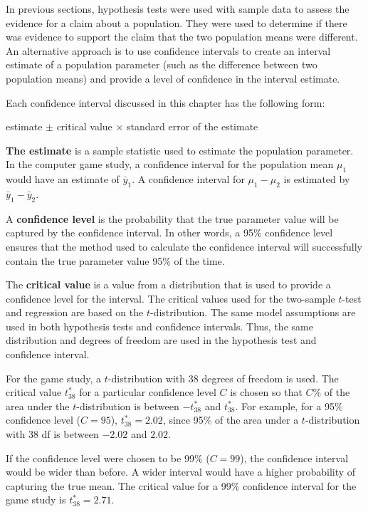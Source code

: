 \documentclass[
]{book}
\begin{document}
In previous sections, hypothesis tests were used with sample data to assess the evidence for a claim about a population. They were used to determine if there was evidence to support the claim that the two population means were different. An alternative approach is to use confidence intervals to create an interval estimate of a population parameter (such as the difference between two population means) and provide a level of confidence in the interval estimate.

Each confidence interval discussed in this chapter has the following form:

estimate \(\pm\) critical value \(\times\) standard error of the estimate

\textbf{The estimate} is a sample statistic used to estimate the population parameter. In the computer game study, a confidence interval for the population mean \(\mu_1\) would have an estimate of \(\bar{y}_1\). A confidence interval for \(\mu_1 - \mu_2\) is estimated by \(\bar{y}_1 - \bar{y}_2\).

A \textbf{confidence level} is the probability that the true parameter value will be captured by the confidence interval. In other words, a 95\% confidence level ensures that the method used to calculate the confidence interval will successfully contain the true parameter value 95\% of the time.

The \textbf{critical value} is a value from a distribution that is used to provide a confidence level for the interval. The critical values used for the two-sample \(t\)-test and regression are based on the \(t\)-distribution. The same model assumptions are used in both hypothesis tests and confidence intervals. Thus, the same distribution and degrees of freedom are used in the hypothesis test and confidence interval.

For the game study, a \(t\)-distribution with 38 degrees of freedom is used. The critical value \(t^*_{38}\) for a particular confidence level \(C\) is chosen so that \(C\)\% of the area under the \(t\)-distribution is between \(-t^*_{38}\) and \(t^*_{38}\). For example, for a 95\% confidence level (\(C = 95\)), \(t^*_{38} = 2.02\), since 95\% of the area under a \(t\)-distribution with 38 df is between \(-2.02\) and \(2.02\).

If the confidence level were chosen to be 99\% (\(C = 99\)), the confidence interval would be wider than before. A wider interval would have a higher probability of capturing the true mean. The critical value for a 99\% confidence interval for the game study is \(t^*_{38} = 2.71\).
\end{document}
